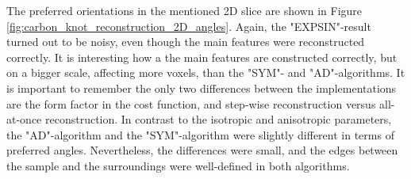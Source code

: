 \clearpage
The preferred orientations in the mentioned 2D slice are shown in Figure \ref{fig:carbon_knot_reconstruction_2D_angles}. %
Again, the "EXPSIN"-result turned out to be noisy, even though the main features were reconstructed correctly.
It is interesting how a the main features are constructed correctly, but on a bigger scale, affecting more voxels, than the "SYM"- and "AD"-algorithms.
It is important to remember the only two differences between the implementations are the form factor in the cost function, and step-wise reconstruction versus all-at-once reconstruction.
In contrast to the isotropic and anisotropic parameters,
the "AD"-algorithm and the "SYM"-algorithm were slightly different in terms of preferred angles.
Nevertheless, the differences were small, and the edges between the sample and the surroundings were well-defined in both algorithms.

